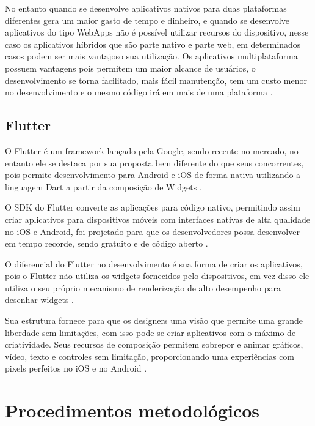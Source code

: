 \documentclass{ifto-tex}
\begin{document}
	No entanto quando se desenvolve aplicativos nativos para duas plataformas diferentes gera um maior gasto de tempo e dinheiro, e quando se desenvolve aplicativos do tipo WebApps não é possível utilizar recursos do dispositivo, nesse caso os aplicativos híbridos que são parte nativo e parte web, em determinados casos podem ser mais vantajoso sua utilização.
	Os aplicativos multiplataforma possuem vantagens pois permitem um maior alcance de usuários, o desenvolvimento se torna facilitado, mais fácil manutenção, tem um custo menor no desenvolvimento e o mesmo código irá em mais de uma plataforma \cite{Benefits70:online}.
	
	
	\section{Flutter}
O Flutter é um framework lançado pela Google, sendo recente no mercado, no entanto ele se destaca por sua proposta bem diferente do que seus concorrentes, pois permite desenvolvimento para Android e iOS de forma nativa utilizando a linguagem Dart a partir da composição de Widgets \cite{Conhecen37:online}.

O SDK do Flutter converte as aplicações para código nativo, permitindo assim criar aplicativos para dispositivos móveis com interfaces nativas de alta qualidade no iOS e Android, foi projetado para que os desenvolvedores possa desenvolver em tempo recorde, sendo gratuito e de código aberto \cite{flutterf54:online}.

O diferencial do Flutter no desenvolvimento é sua forma de criar os aplicativos, pois o Flutter não utiliza os widgets fornecidos pelo dispositivos, em vez disso ele utiliza o seu próprio mecanismo de renderização de alto desempenho para desenhar widgets \cite{corazza2018aplicativo}.

Sua estrutura fornece para que os designers uma visão que permite uma grande liberdade sem limitações, com isso pode se criar aplicativos com o máximo de criatividade. Seus recursos de composição permitem sobrepor e animar gráficos, vídeo, texto e controles sem limitação, proporcionando uma experiências com pixels perfeitos no iOS e no Android \cite{flutterf54:online}.

	
	
\chapter{Procedimentos metodológicos}
	
\end{document}
